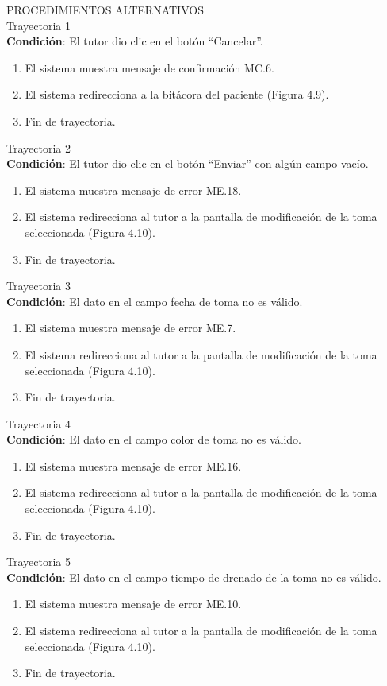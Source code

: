 \vspace*{1cm}
\Large{PROCEDIMIENTOS ALTERNATIVOS}\\
\large{Trayectoria 1}\\
\textbf{Condición}: El tutor dio clic en el botón “Cancelar”.
\begin{enumerate}
\item El sistema muestra mensaje de confirmación MC.6. 
\item El sistema redirecciona a la bitácora del paciente (Figura 4.9).
\item Fin de trayectoria.
\end{enumerate}
\large{Trayectoria 2}\\
\textbf{Condición}: El tutor dio clic en el botón “Enviar” con algún campo vacío.
\begin{enumerate}
\item El sistema muestra mensaje de error ME.18.
\item El sistema redirecciona al tutor a la pantalla de modificación de la toma seleccionada (Figura 4.10).
\item Fin de trayectoria.
\end{enumerate}
\large{Trayectoria 3}\\
\textbf{Condición}: El dato en el campo fecha de toma no es válido.
\begin{enumerate}
\item El sistema muestra mensaje de error ME.7.
\item El sistema redirecciona al tutor a la pantalla de modificación de la toma seleccionada (Figura 4.10).
\item Fin de trayectoria.
\end{enumerate}
\large{Trayectoria 4}\\
\textbf{Condición}: El dato en el campo color de toma no es válido.
\begin{enumerate}
\item El sistema muestra mensaje de error ME.16.
\item El sistema redirecciona al tutor a la pantalla de modificación de la toma seleccionada (Figura 4.10).
\item Fin de trayectoria.
\end{enumerate}
\large{Trayectoria 5}\\
\textbf{Condición}: El dato en el campo tiempo de drenado de la toma no es válido.
\begin{enumerate}
\item El sistema muestra mensaje de error ME.10.
\item El sistema redirecciona al tutor a la pantalla de modificación de la toma seleccionada (Figura 4.10).
\item Fin de trayectoria.
\end{enumerate}
